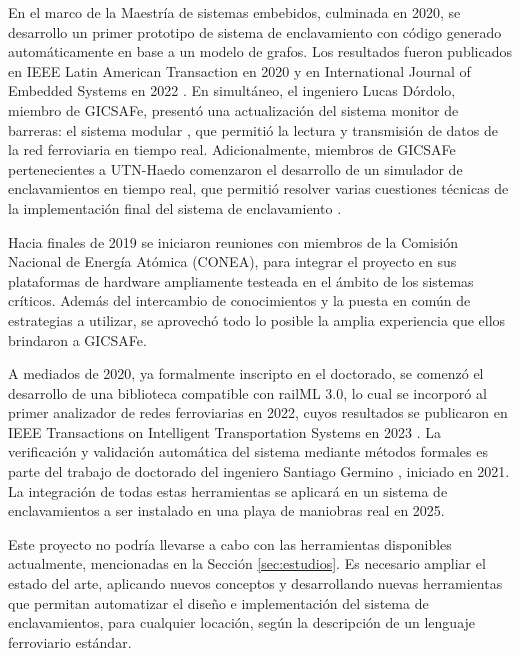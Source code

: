     En el marco de la Maestría de sistemas embebidos, culminada en 2020, se desarrollo un primer prototipo de sistema de enclavamiento con código generado automáticamente en base a un modelo de grafos. Los resultados fueron publicados en IEEE Latin American Transaction en 2020 \cite{Paper_204} y en International Journal of Embedded Systems en 2022 \cite{Paper_206}. En simultáneo, el ingeniero Lucas Dórdolo, miembro de GICSAFe, presentó una actualización del sistema monitor de barreras: el sistema modular \cite{Paper_209}, que permitió la lectura y transmisión de datos de la red ferroviaria en tiempo real. Adicionalmente, miembros de GICSAFe pertenecientes a UTN-Haedo comenzaron el desarrollo de un simulador de enclavamientos en tiempo real, que permitió resolver varias cuestiones técnicas de la implementación final del sistema de enclavamiento \cite{Paper_205}.

    Hacia finales de 2019 se iniciaron reuniones con miembros de la Comisión Nacional de Energía Atómica (CONEA), para integrar el proyecto en sus plataformas de hardware ampliamente testeada en el ámbito de los sistemas críticos. Además del intercambio de conocimientos y la puesta en común de estrategias a utilizar, se aprovechó todo lo posible la amplia experiencia que ellos brindaron a GICSAFe.
    
    A mediados de 2020, ya formalmente inscripto en el doctorado, se comenzó el desarrollo de una biblioteca compatible con railML 3.0, lo cual se incorporó al primer analizador de redes ferroviarias en 2022, cuyos resultados se publicaron en IEEE Transactions on Intelligent Transportation Systems en 2023 \cite{Paper_208}. La verificación y validación automática del sistema mediante métodos formales es parte del trabajo de doctorado del ingeniero Santiago Germino \cite{Paper_207}, iniciado en 2021. La integración de todas estas herramientas se aplicará en un sistema de enclavamientos a ser instalado en una playa de maniobras real en 2025. 
    
    Este proyecto no podría llevarse a cabo con las herramientas disponibles actualmente, mencionadas en la Sección \ref{sec:estudios}. Es necesario ampliar el estado del arte, aplicando nuevos conceptos y desarrollando nuevas herramientas que permitan automatizar el diseño e implementación del sistema de enclavamientos, para cualquier locación, según la descripción de un lenguaje ferroviario estándar.
    
    
    
    
    
    
    
    
    
    